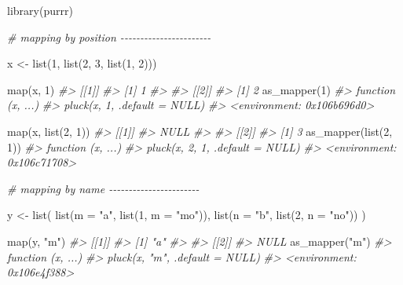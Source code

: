 \documentclass[
]{book}
\newenvironment{Shaded}{\begin{snugshade}}{\end{snugshade}}
\newcommand{\AttributeTok}[1]{\textcolor[rgb]{0.77,0.63,0.00}{#1}}
\newcommand{\CommentTok}[1]{\textcolor[rgb]{0.56,0.35,0.01}{\textit{#1}}}
\newcommand{\DecValTok}[1]{\textcolor[rgb]{0.00,0.00,0.81}{#1}}
\newcommand{\FunctionTok}[1]{\textcolor[rgb]{0.00,0.00,0.00}{#1}}
\newcommand{\NormalTok}[1]{#1}
\newcommand{\OtherTok}[1]{\textcolor[rgb]{0.56,0.35,0.01}{#1}}
\newcommand{\StringTok}[1]{\textcolor[rgb]{0.31,0.60,0.02}{#1}}
\begin{document}
\begin{Shaded}
\begin{Highlighting}[]
\FunctionTok{library}\NormalTok{(purrr)}

\CommentTok{\# mapping by position {-}{-}{-}{-}{-}{-}{-}{-}{-}{-}{-}{-}{-}{-}{-}{-}{-}{-}{-}{-}{-}{-}{-}}

\NormalTok{x }\OtherTok{\textless{}{-}} \FunctionTok{list}\NormalTok{(}\DecValTok{1}\NormalTok{, }\FunctionTok{list}\NormalTok{(}\DecValTok{2}\NormalTok{, }\DecValTok{3}\NormalTok{, }\FunctionTok{list}\NormalTok{(}\DecValTok{1}\NormalTok{, }\DecValTok{2}\NormalTok{)))}

\FunctionTok{map}\NormalTok{(x, }\DecValTok{1}\NormalTok{)}
\CommentTok{\#\textgreater{} [[1]]}
\CommentTok{\#\textgreater{} [1] 1}
\CommentTok{\#\textgreater{} }
\CommentTok{\#\textgreater{} [[2]]}
\CommentTok{\#\textgreater{} [1] 2}
\FunctionTok{as\_mapper}\NormalTok{(}\DecValTok{1}\NormalTok{)}
\CommentTok{\#\textgreater{} function (x, ...) }
\CommentTok{\#\textgreater{} pluck(x, 1, .default = NULL)}
\CommentTok{\#\textgreater{} \textless{}environment: 0x106b696d0\textgreater{}}

\FunctionTok{map}\NormalTok{(x, }\FunctionTok{list}\NormalTok{(}\DecValTok{2}\NormalTok{, }\DecValTok{1}\NormalTok{))}
\CommentTok{\#\textgreater{} [[1]]}
\CommentTok{\#\textgreater{} NULL}
\CommentTok{\#\textgreater{} }
\CommentTok{\#\textgreater{} [[2]]}
\CommentTok{\#\textgreater{} [1] 3}
\FunctionTok{as\_mapper}\NormalTok{(}\FunctionTok{list}\NormalTok{(}\DecValTok{2}\NormalTok{, }\DecValTok{1}\NormalTok{))}
\CommentTok{\#\textgreater{} function (x, ...) }
\CommentTok{\#\textgreater{} pluck(x, 2, 1, .default = NULL)}
\CommentTok{\#\textgreater{} \textless{}environment: 0x106c71708\textgreater{}}

\CommentTok{\# mapping by name {-}{-}{-}{-}{-}{-}{-}{-}{-}{-}{-}{-}{-}{-}{-}{-}{-}{-}{-}{-}{-}{-}{-}}

\NormalTok{y }\OtherTok{\textless{}{-}} \FunctionTok{list}\NormalTok{(}
  \FunctionTok{list}\NormalTok{(}\AttributeTok{m =} \StringTok{"a"}\NormalTok{, }\FunctionTok{list}\NormalTok{(}\DecValTok{1}\NormalTok{, }\AttributeTok{m =} \StringTok{"mo"}\NormalTok{)),}
  \FunctionTok{list}\NormalTok{(}\AttributeTok{n =} \StringTok{"b"}\NormalTok{, }\FunctionTok{list}\NormalTok{(}\DecValTok{2}\NormalTok{, }\AttributeTok{n =} \StringTok{"no"}\NormalTok{))}
\NormalTok{)}

\FunctionTok{map}\NormalTok{(y, }\StringTok{"m"}\NormalTok{)}
\CommentTok{\#\textgreater{} [[1]]}
\CommentTok{\#\textgreater{} [1] "a"}
\CommentTok{\#\textgreater{} }
\CommentTok{\#\textgreater{} [[2]]}
\CommentTok{\#\textgreater{} NULL}
\FunctionTok{as\_mapper}\NormalTok{(}\StringTok{"m"}\NormalTok{)}
\CommentTok{\#\textgreater{} function (x, ...) }
\CommentTok{\#\textgreater{} pluck(x, "m", .default = NULL)}
\CommentTok{\#\textgreater{} \textless{}environment: 0x106e4f388\textgreater{}}


\end{Highlighting}
\end{Shaded}
\end{document}
